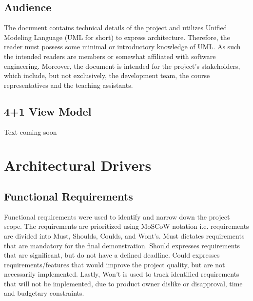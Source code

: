 \documentclass[12pt]{article}
\begin{document}
\subsection{Audience}
  The document contains technical details of the project and utilizes Unified Modeling Language (UML for short) to express architecture. Therefore, the reader must possess some minimal or introductory knowledge of UML. As such the intended readers are members or somewhat affiliated with software engineering. Moreover, the document is intended for the project’s stakeholders, which include, but not exclusively, the development team, the course representatives and the teaching assistants.
    
\subsection{4+1 View Model}
Text coming soon
\pagebreak

\section{Architectural Drivers}
\subsection{Functional Requirements}
Functional requirements were used to identify and narrow down the project scope. The requirements are prioritized using MoSCoW notation i.e. requirements are divided into Must, Shoulds, Coulds, and Wont’s. Must dictates requirements that are mandatory for the final demonstration. Should expresses requirements that are significant, but do not have a defined deadline. Could expresses requirements/features that would improve the project quality, but are not necessarily implemented. Lastly, Won’t is used to track identified requirements that will not be implemented, due to product owner dislike or disapproval, time and budgetary constraints.\par
\end{document}
